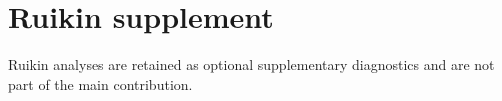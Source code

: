 \section{Ruikin supplement}\nDetailed Ruikin analyses are retained as optional supplementary diagnostics and are not part of the main contribution.\n
